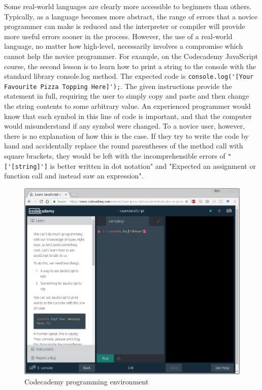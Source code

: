 Some real-world languages are clearly more accessible to beginners than others. Typically, as a language becomes more abstract, the range of errors that a novice programmer can make is reduced and the interpreter or compiler will provide more useful errors sooner in the process. However, the use of a real-world language, no matter how high-level, necessarily involves a compromise which cannot help the novice programmer. For example, on the Codecademy JavaScript course, the second lesson is to learn how to print a string to the console with the standard library console.log method. The expected code is \verb+console.log('[Your Favourite Pizza Topping Here]');+. The given instructions provide the statement in full, requiring the user to simply copy and paste and then change the string contents to some arbitrary value. An experienced programmer would know that each symbol in this line of code is important, and that the computer would misunderstand if any symbol were changed. To a novice user, however, there is no explanation of how this is the case. If they try to write the code by hand and accidentally replace the round parentheses of the method call with square brackets, they would be left with the incomprehensible errors of \verb+"['[string]']+ is better written in dot notation" and "Expected an assignment or function call and instead saw an expression".

\begin{figure}[H]
\centering
\includegraphics[width=\textwidth]{graphics/codecademy} %
\caption{Codecademy programming environment}
\label{fig:codecademy} %
\end{figure}

